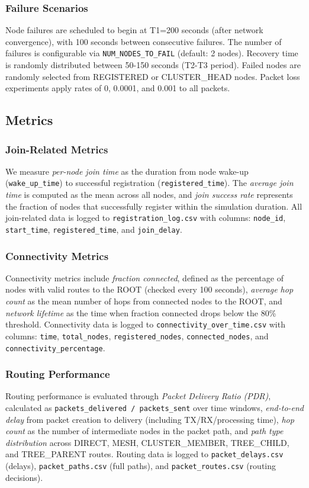 \documentclass[conference]{IEEEtran}
\begin{document}
\subsubsection{Failure Scenarios}
Node failures are scheduled to begin at T1=200 seconds (after network convergence), with 100 seconds between consecutive failures. The number of failures is configurable via \texttt{NUM\_NODES\_TO\_FAIL} (default: 2 nodes). Recovery time is randomly distributed between 50-150 seconds (T2-T3 period). Failed nodes are randomly selected from REGISTERED or CLUSTER\_HEAD nodes. Packet loss experiments apply rates of 0, 0.0001, and 0.001 to all packets.

\subsection{Metrics}

\subsubsection{Join-Related Metrics}
We measure \emph{per-node join time} as the duration from node wake-up (\texttt{wake\_up\_time}) to successful registration (\texttt{registered\_time}). The \emph{average join time} is computed as the mean across all nodes, and \emph{join success rate} represents the fraction of nodes that successfully register within the simulation duration. All join-related data is logged to \texttt{registration\_log.csv} with columns: \texttt{node\_id}, \texttt{start\_time}, \texttt{registered\_time}, and \texttt{join\_delay}.

\subsubsection{Connectivity Metrics}
Connectivity metrics include \emph{fraction connected}, defined as the percentage of nodes with valid routes to the ROOT (checked every 100 seconds), \emph{average hop count} as the mean number of hops from connected nodes to the ROOT, and \emph{network lifetime} as the time when fraction connected drops below the 80\% threshold. Connectivity data is logged to \texttt{connectivity\_over\_time.csv} with columns: \texttt{time}, \texttt{total\_nodes}, \texttt{registered\_nodes}, \texttt{connected\_nodes}, and \texttt{connectivity\_percentage}.

\subsubsection{Routing Performance}
Routing performance is evaluated through \emph{Packet Delivery Ratio (PDR)}, calculated as \texttt{packets\_delivered / packets\_sent} over time windows, \emph{end-to-end delay} from packet creation to delivery (including TX/RX/processing time), \emph{hop count} as the number of intermediate nodes in the packet path, and \emph{path type distribution} across DIRECT, MESH, CLUSTER\_MEMBER, TREE\_CHILD, and TREE\_PARENT routes. Routing data is logged to \texttt{packet\_delays.csv} (delays), \texttt{packet\_paths.csv} (full paths), and \texttt{packet\_routes.csv} (routing decisions).
\end{document}
